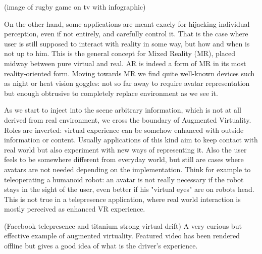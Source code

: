 (image of rugby game on tv with infographic)

On the other hand, some applications are meant exacly for hijacking individual perception, even if not entirely, and carefully control it. That is the case where user is still supposed to interact with reality in some way, but how and when is not up to him. This is the general concept for Mixed Reality (MR), placed midway between pure virtual and real. AR is indeed a form of MR in its most reality-oriented form. Moving towards MR we find quite well-known devices such as night or heat vision goggles: not so far away to require avatar representation but enough obtrusive to completely replace environment as we see it.

As we start to inject into the scene arbitrary information, which is not at all derived from real environment, we cross the boundary of Augmented Virtuality. Roles are inverted: virtual experience can be somehow enhanced with outside information or content. Usually applications of this kind aim to keep contact with real world but also experiment with new ways of representing it. Also the user feels to be somewhere different from everyday world, but still are cases where avatars are not needed depending on the implementation. Think for example to teleoperating a humanoid robot: an avatar is not really necessary if the robot stays in the sight of the user, even better if his "virtual eyes" are on robots head. This is not true in a telepresence application, where real world interaction is mostly perceived as enhanced VR experience.

(Facebook telepresence and titanium strong virtual drift) A very curious but effective example of augmented virtuality. Featured video has been rendered offline but gives a good idea of what is the driver's experience.

